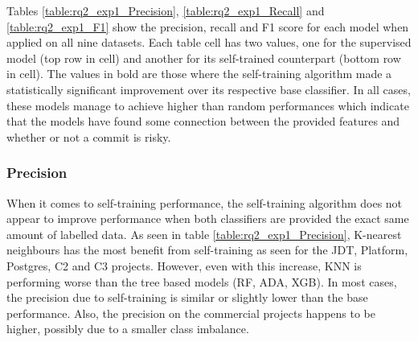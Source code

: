 \documentclass[../main.tex]{subfiles}
\begin{document}
Tables \ref{table:rq2_exp1_Precision}, \ref{table:rq2_exp1_Recall} and \ref{table:rq2_exp1_F1} show the precision, recall and F1 score for each model when applied on all nine datasets. Each table cell has two values, one for the supervised model (top row in cell) and another for its self-trained counterpart (bottom row in cell). The values in bold are those where the self-training algorithm made a statistically significant improvement over its respective base classifier. In all cases, these models manage to achieve higher than random performances which indicate that the models have found some connection between the provided features and whether or not a commit is risky. 

\subsubsection{Precision}

When it comes to self-training performance, the self-training algorithm does not appear to improve performance when both classifiers are provided the exact same amount of labelled data. As seen in table \ref{table:rq2_exp1_Precision}, K-nearest neighbours has the most benefit from self-training as seen for the JDT, Platform, Postgres, C2 and C3 projects. However, even with this increase, KNN is performing worse than the tree based models (RF, ADA, XGB). In most cases, the precision due to self-training is similar or slightly lower than the base performance. Also, the precision on the commercial projects happens to be higher, possibly due to a smaller class imbalance.
\end{document}
